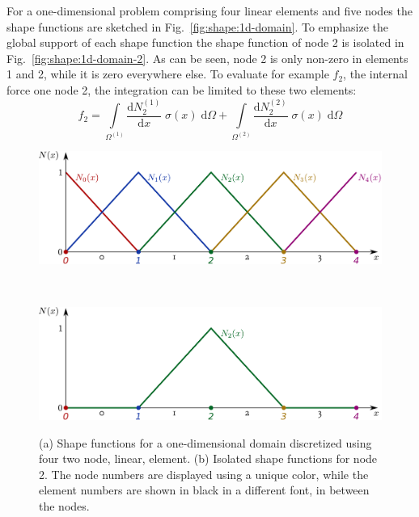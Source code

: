 \documentclass[times,namecite]{goose-article}
\begin{document}
For a one-dimensional problem comprising four linear elements and five nodes the shape functions are sketched in Fig.~\ref{fig:shape:1d-domain}. To emphasize the global support of each shape function the shape function of node 2 is isolated in Fig.~\ref{fig:shape:1d-domain-2}. As can be seen, node 2 is only non-zero in elements 1 and 2, while it is zero everywhere else. To evaluate for example $f_2$, the internal force one node 2, the integration can be limited to these two elements:
\begin{equation}
  f_2
  =
  \int\limits_{\Omega^{(1)}}
    \frac{\mathrm{d} N^{(1)}_2}{\mathrm{d} x} \;
    \sigma (x) \;
  \mathrm{d}\Omega
  +
  \int\limits_{\Omega^{(2)}}
    \frac{\mathrm{d} N^{(2)}_2}{\mathrm{d} x} \;
    \sigma (x) \;
  \mathrm{d}\Omega
\end{equation}

\begin{figure}[htp]
  \centering
  \captionsetup[subfigure]{justification=centering}
  \begin{minipage}[t]{.5\textwidth}
    \centering
    \includegraphics[width=1.\textwidth]{figures/shape-functions-1d.pdf}
    \label{fig:shape:1d-domain}
  \end{minipage}
  \\
  \begin{minipage}[t]{.5\textwidth}
    \centering
    \includegraphics[width=1.\textwidth]{figures/shape-functions-1d-node-2.pdf}
    \label{fig:shape:1d-domain-2}
  \end{minipage}
  \caption{(a) Shape functions for a one-dimensional domain discretized using four two node, linear, element. (b) Isolated shape functions for node 2. The node numbers are displayed using a unique color, while the element numbers are shown in black in a different font, in between the nodes.}
  \label{fig:shape:1d-domain:fig}
\end{figure}
\end{document}
